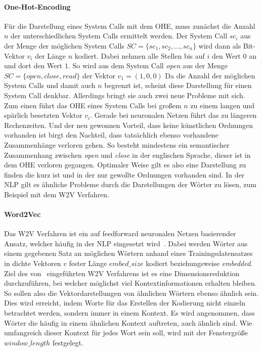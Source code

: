             \paragraph{One-Hot-Encoding}
                Für die Darstellung eines System Calls mit dem \ac{OHE}, muss zunächst die Anzahl $n$ der unterschiedlichen System Calls ermittelt werden.
                Der System Call $sc_i$ aus der Menge der möglichen System Calls $ SC = \{sc_1,sc_2,\dots,sc_n\}$ 
                wird dann als Bit-Vektor $v_i$ der Länge $n$ kodiert.
                Dabei nehmen alle Stellen bis auf $i$ den Wert $0$ an und dort den Wert $1$.
                So wird aus dem System Call \textit{open} aus der Menge $SC = \{open, close, read\}$ der Vektor $v_1 = (1, 0, 0)$
                Da die Anzahl der möglichen System Calls und damit auch $n$ begrenzt ist, scheint diese Darstellung für einen System Call denkbar.
                Allerdings bringt sie auch zwei neue Probleme mit sich.
                Zum einen führt das \ac{OHE} eines System Calls bei großem $n$ zu einem langen und spärlich besetzten Vektor $v_i$.
                Gerade bei neuronalen Netzen führt das zu längeren Rechenzeiten.
                Und der neu gewonnen Vorteil, dass keine künstlichen Ordnungen vorhanden ist birgt den Nachteil, dass tatsächlich ebenso vorhandene Zusammenhänge verloren gehen.
                So besteht mindestens ein semantischer Zusammenhang zwischen \textit{open} und \textit{close} in der englischen Sprache, dieser ist in dem \ac{OHE} verloren gegangen. 
                Optimaler Weise gilt es also eine Darstellung zu finden die kurz ist und in der nur gewollte Ordnungen vorhanden sind.
                In der \ac{NLP} gilt es ähnliche Probleme durch die Darstellungen der Wörter zu lösen, zum Beispiel mit dem \ac{W2V} Verfahren.

            \paragraph{Word2Vec}
                Das \ac{W2V} Verfahren ist ein auf feedforward neuronalen Netzen basierender Ansatz, welcher häufig in der \ac{NLP} eingesetzt wird~\cite{W2VAYYADEVARA2018}.
                Dabei werden Wörter aus einem gegebenen Satz an möglichen Wörtern anhand eines Trainingsdatensatzes in dichte Vektoren $v$ fester Länge $embed\_size$ kodiert beziehungsweise \textit{embedded}.
                Ziel des von~\cite{W2VMIKOLOV2013} eingeführten \ac{W2V} Verfahrens ist es eine Dimensionsreduktion durchzuführen, bei welcher möglichst viel Kontextinformationen erhalten bleiben.
                So sollen also die Vektordarstellungen von ähnlichen Wörtern ebenso ähnlich sein.
                Dies wird erreicht, indem Worte für das Erstellen der Kodierung nicht einzeln betrachtet werden, sondern immer in einem Kontext.
                Es wird angenommen, dass Wörter die häufig in einem ähnlichen Kontext auftreten, auch ähnlich sind.
                Wie umfangreich dieser Kontext für jedes Wort sein soll, wird mit der Fenstergröße $window\_length$ festgelegt.

